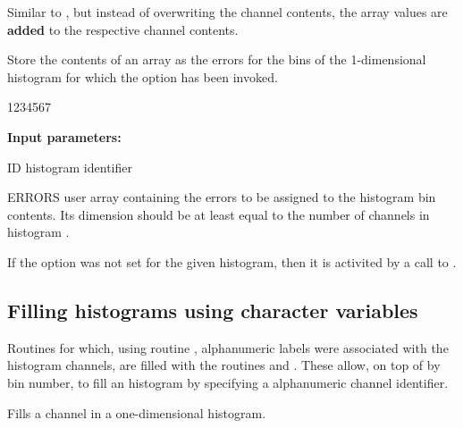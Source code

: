  
\Action 
Similar to , but instead of overwriting the
channel contents, the array values are {\bf added} to the
respective channel contents.
 
 
 
\Action 
Store the contents of an array 
as the errors for the bins of the 1-dimensional histogram for
which the option  has been invoked.
 
\begin{DLttc}{1234567}
\item[{\rm\bf Input parameters:}]
\item[ID] histogram identifier
\item[ERRORS] user array containing the errors to be assigned to the
       histogram bin contents. Its dimension should be at least equal to
       the number of channels in histogram .
\end{DLttc}
 
\Remark
 
If the  option was not set for the given histogram, then
it is activited by a call to .


\subsection{Filling histograms using character variables}

Routines for which, using routine , alphanumeric 
labels were associated with the histogram channels, 
are filled with the routines  and .
These allow, on top of by bin number, 
to fill an histogram by specifying a alphanumeric channel identifier.


\Action Fills a channel in a one-dimensional histogram.

